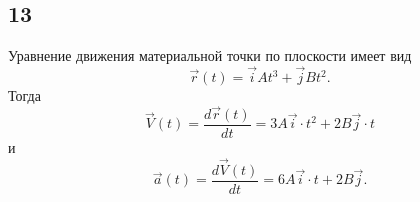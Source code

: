\subsection{13}

Уравнение движения материальной точки по плоскости имеет вид
\[
\vec r(t)=\vec iAt^3+\vec jBt^2.
\]
Тогда
\[
\vec V(t)=\frac{d\vec r(t)}{dt}=3A\vec i\cdot t^2+2B\vec j\cdot t
\]
и
\[
\vec a(t)=\frac{d\vec V(t)}{dt}=6A\vec i\cdot t+2B\vec j.
\]